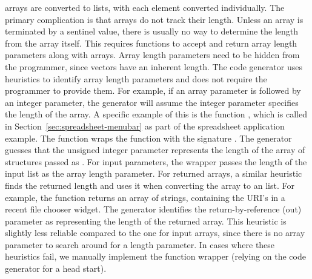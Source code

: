 \documentclass[article,shortnames]{jss}
\begin{document}
 arrays are converted to  lists, 
with each
element
converted individually. The primary complication is that 
arrays 
do not track their length. Unless an array is terminated by a sentinel
value,
there is usually no way to determine the length from the array itself.
This 
requires  functions to accept and return array length
parameters
along with arrays. Array length parameters need to be hidden from the
 programmer, since  vectors have an inherent
length.
The code generator uses heuristics to identify array length parameters
and
does not require the  programmer to provide them. 
For
example,
if an array parameter is followed by an integer parameter, the
generator
will assume the integer parameter specifies the length of the array.
A specific example of this is the function
, which is called in Section~\ref{sec:spreadsheet-menubar} as part of the spreadsheet application
example. The function wraps the  function with the
signature . The generator guesses that the unsigned integer
 parameter represents the length of the array of
 structures passed as . 
For input parameters, the wrapper passes the length of the input
 list as the array length parameter. For returned arrays,
a similar heuristic finds the returned length and uses it when
converting the array to an  list. For example, the
 function
 returns an array of strings, containing the URI's in a
recent file chooser widget. The generator identifies the 
return-by-reference (out) parameter as representing the length of the
returned array. This heuristic is slightly less reliable compared to
the one for input arrays, since there is no array parameter to search
around for a length parameter.
In cases where these heuristics fail, we manually implement the
function wrapper (relying on the code generator for a head start).
\end{document}
